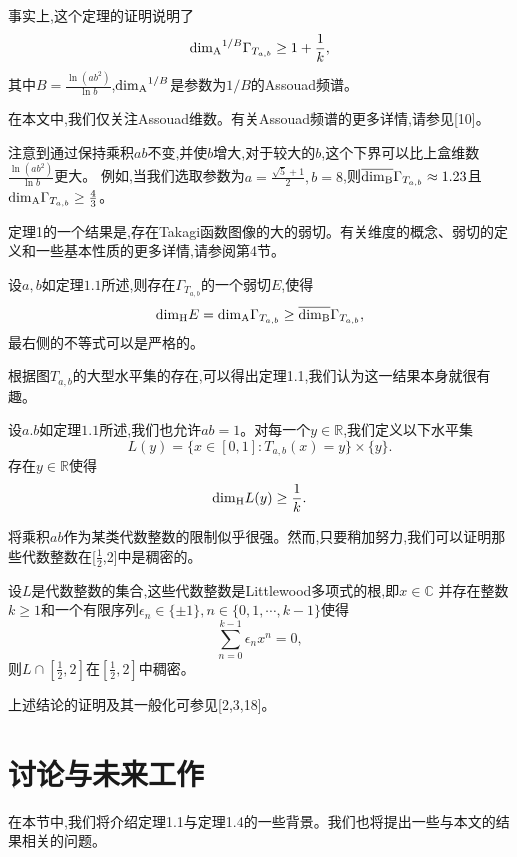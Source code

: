 \begin{remark}
      事实上,这个定理的证明说明了
      $$
      \mathrm{\dim_A}^{1/B}\Gamma_{T_{a,b}}\ge1+\frac{1}{k},
      $$
      其中$B=\frac{\ln(ab^2)}{\ln b}$,$\mathrm{\dim_A}^{1/B}$是参数为$1/B$的Assouad频谱。
\end{remark}

在本文中,我们仅关注Assouad维数。有关Assouad频谱的更多详情,请参见[10]。

注意到通过保持乘积$ab$不变,并使$b$增大,对于较大的$b$,这个下界可以比上盒维数$\frac{\ln(ab^2)}{\ln b}$更大。
例如,当我们选取参数为$a=\frac{\sqrt{5}+1}{2},b=8$,则$\overline{\mathrm{\dim_B}}\Gamma_{T_{a,b}}\approx1.23$且
$\mathrm{\dim_A}\Gamma_{T_{a,b}}\ge\frac{4}{3}$。

定理1的一个结果是,存在Takagi函数图像的大的弱切。有关维度的概念、弱切的定义和一些基本性质的更多详情,请参阅第4节。

\begin{lemma}[弱切]
      设$a,b$如定理$1.1$所述,则存在$\Gamma_{T_{a,b}}$的一个弱切$E$,使得
      $$
      \mathrm{\dim_H} E=\mathrm{\dim_A}\Gamma_{T_{a,b}}\ge\overline{\mathrm{\dim_B}}\Gamma_{T_{a,b}},
      $$
      最右侧的不等式可以是严格的。
\end{lemma}

根据图$T_{a,b}$的大型水平集的存在,可以得出定理1.1,我们认为这一结果本身就很有趣。

\begin{theorem}
      设$a.b$如定理$1.1$所述,我们也允许$ab=1$。对每一个$y\in\mathbb{R}$,我们定义以下水平集
      $$
      L(y) = \{x\in[0,1]:T_{a,b}(x)=y\}\times\{y\}.
      $$
      存在$y\in\mathbb{R}$使得
      $$
      \mathrm{\dim_H} L(y)\ge\frac{1}{k}.
      $$
\end{theorem}

将乘积$ab$作为某类代数整数的限制似乎很强。然而,只要稍加努力,我们可以证明那些代数整数在[$\frac{1}{2}$,2]中是稠密的。

\begin{theoremno}
      设$L$是代数整数的集合,这些代数整数是Littlewood多项式的根,即$x\in\mathbb{C}$
      并存在整数$k\ge1$和一个有限序列$\epsilon_n\in\{\pm1\},n\in\{0,1,\cdots,k-1\}$使得
      $$
      \sum_{n=0}^{k-1}\epsilon_nx^n=0,
      $$
      则$L\cap[\frac{1}{2},2]$在$[\frac{1}{2},2]$中稠密。
\end{theoremno}

上述结论的证明及其一般化可参见[2,3,18]。

\section{讨论与未来工作}
在本节中,我们将介绍定理1.1与定理1.4的一些背景。我们也将提出一些与本文的结果相关的问题。

